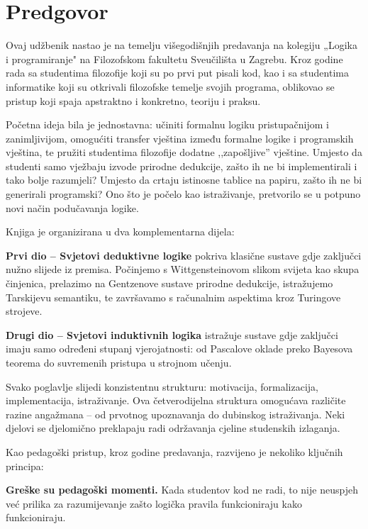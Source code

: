 \chapter*{Predgovor}

Ovaj udžbenik nastao je na temelju višegodišnjih predavanja na kolegiju „Logika i programiranje" na Filozofskom fakultetu
Sveučilišta u Zagrebu.
Kroz godine rada sa studentima filozofije koji su po prvi put pisali kod,
kao i sa studentima informatike koji su otkrivali filozofske temelje svojih programa,
oblikovao se  pristup koji spaja apstraktno i konkretno, teoriju i praksu.

Početna ideja bila je jednostavna: učiniti formalnu logiku pristupačnijom i zanimljivijom, omogućiti transfer vještina između formalne logike i programskih vještina,
te pružiti studentima filozofije dodatne ,,zapošljive'' vještine.
Umjesto da studenti samo vježbaju izvode prirodne dedukcije, zašto ih ne bi implementirali i tako bolje razumjeli?
Umjesto da crtaju istinosne tablice na papiru, zašto ih ne bi generirali programski?
Ono što je počelo kao istraživanje, pretvorilo se u potpuno novi način podučavanja logike.

Knjiga je organizirana u dva komplementarna dijela:

\textbf{Prvi dio – Svjetovi deduktivne logike} pokriva klasične sustave gdje zaključci nužno slijede iz premisa. Počinjemo s Wittgensteinovom slikom svijeta kao skupa činjenica, prelazimo na Gentzenove sustave prirodne dedukcije, istražujemo Tarskijevu semantiku, te završavamo s računalnim aspektima kroz Turingove strojeve.

\textbf{Drugi dio – Svjetovi induktivnih logika} istražuje sustave gdje zaključci imaju samo određeni stupanj vjerojatnosti: od Pascalove oklade preko Bayesova teorema do suvremenih pristupa u strojnom učenju.

Svako poglavlje slijedi konzistentnu strukturu: motivacija, formalizacija, implementacija, istraživanje.
Ova četverodijelna struktura omogućava različite razine angažmana – od prvotnog upoznavanja do dubinskog istraživanja.
Neki djelovi se djelomično preklapaju radi održavanja cjeline studenskih izlaganja.


Kao pedagoški pristup, kroz godine predavanja, razvijeno je nekoliko ključnih principa:

\textbf{Greške su pedagoški momenti.} Kada studentov kod ne radi, to nije neuspjeh već prilika za razumijevanje zašto logička pravila funkcioniraju kako funkcioniraju.

